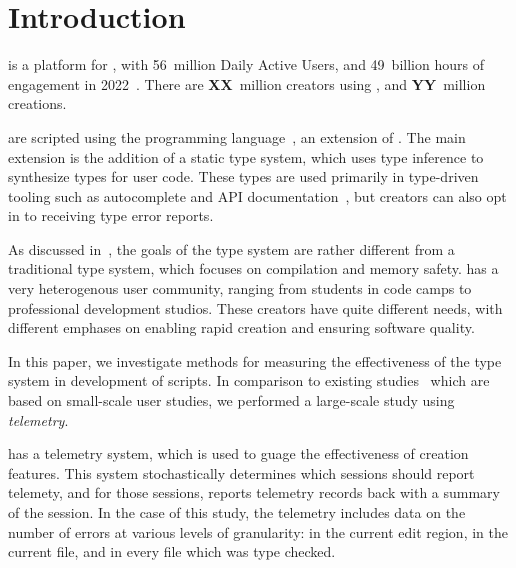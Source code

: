\documentclass[
  acmsmall,
  review,
  anonymous,
]{acmart}
\begin{document}


\maketitle

\section{Introduction}
\label{s:introduction}

 is a platform for ,
with 56~million Daily Active Users, and 49~billion hours of engagement in
2022~.
There are \textbf{XX}~million creators using ,
and \textbf{YY}~million creations.

 are scripted using the 
 programming language~,
an extension of .
The main extension is the addition of a static type system, which uses
type inference to synthesize types for user code. These types
are used primarily in type-driven tooling such as autocomplete
and API documentation~,
but creators can also opt in to receiving type error reports.

As discussed in~,
the goals of the  type system are rather different from
a traditional type system, which focuses on compilation and memory safety.
 has a very heterogenous user community, ranging from
students in code camps to professional development studios. These
creators have quite different needs, with different emphases on
enabling rapid creation and ensuring software quality.

In this paper, we investigate methods for measuring the effectiveness
of the  type system in development of  scripts.
In comparison to existing studies~\cite{BEN-WE-NEED-CITATIONS}
which are based on small-scale user studies, we performed
a large-scale study using \emph{telemetry}.

 has a telemetry system, which is used to guage
the effectiveness of creation features. This system stochastically
determines which sessions should report telemety, and for those
sessions, reports telemetry records back with a summary of the
session. In the case of this study, the telemetry includes data on the
number of errors at various levels of granularity: in the current edit
region, in the current file, and in every file which was type
checked.
\end{document}
